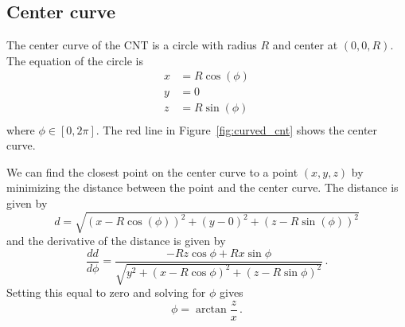 \documentclass[a4paper,10pt]{article}
\numberwithin{equation}{section}
\begin{document}
\subsection{Center curve}
The center curve of the CNT is a circle with radius \(R\) and center at \((0, 0, R)\). The equation of the circle is
\begin{align}
  x &= R\cos(\phi)\\
  y &= 0\\
  z &= R\sin(\phi)\\
\end{align}
where \(\phi \in [0, 2\pi]\). The red line in Figure~\ref{fig:curved_cnt} shows the center curve.

We can find the closest point on the center curve to a point \((x, y, z)\) by minimizing the distance between the point and the center curve.
The distance is given by
\begin{equation}
  d = \sqrt{(x - R\cos(\phi))^2 + (y - 0)^2 + (z - R\sin(\phi))^2}
\end{equation}
and the derivative of the distance is given by
\begin{equation}
  \frac{d d}{d \phi} = \frac{-R z \cos{\phi} + R x \sin{\phi}}{\sqrt{y^2 + (x - R \cos{\phi})^2 + (z - R \sin{\phi})^2}}\, .
\end{equation}
Setting this equal to zero and solving for \(\phi\) gives
\begin{equation}
  \phi = \arctan{\frac{z}{x}}\, .
\end{equation}

\cleardoublepage\printbibliography
\end{document}
